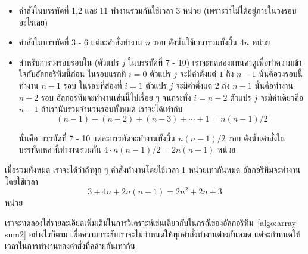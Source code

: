 \begin{itemize}
\item คำสั่ง{\wbr}ใน{\wbr}บรรทัด{\wbr}ที่ 1,2 และ 11 ทำงาน{\wbr}รวม{\wbr}กัน{\wbr}ใช้เวลา 3 หน่วย (เพราะว่า{\wbr}ไม่{\wbr}ได้{\wbr}อยู่{\wbr}ภายใน{\wbr}วงรอบ{\wbr}อะไร{\wbr}เลย)
\item คำสั่ง{\wbr}ใน{\wbr}บรรทัด{\wbr}ที่ 3 - 6 แต่ละ{\wbr}คำสั่ง{\wbr}ทำงาน $n$ รอบ ดังนั้น{\wbr}ใช้เวลา{\wbr}รวม{\wbr}ทั้งสิ้น $4n$ หน่วย{\wbr}
\item สำหรับ{\wbr}การ{\wbr}วงรอบ{\wbr}รอบ{\wbr}ใน (ตัวแปร $j$ ใน{\wbr}บรรทัด{\wbr}ที่ 7 - 10)
เรา{\wbr}จะ{\wbr}ทดลอง{\wbr}แทน{\wbr}ค่า{\wbr}ดู{\wbr}เพื่อ{\wbr}ทำ{\wbr}ความ{\wbr}เข้าใจ{\wbr}กับ{\wbr}อัล{\wbr}กอ{\wbr}ริ{\wbr}ทึม{\wbr}นี้{\wbr}ก่อน ใน{\wbr}รอบ{\wbr}แรก{\wbr}ที่ $i=0$ ตัวแปร $j$
จะ{\wbr}มี{\wbr}ค่า{\wbr}ตั้งแต่ $1$ ถึง $n-1$ นั่น{\wbr}คือ{\wbr}วงรอบ{\wbr}นี้{\wbr}ทำงาน $n-1$ รอบ ใน{\wbr}รอบ{\wbr}ที่{\wbr}สอง{\wbr}ที่ $i=1$
ตัวแปร $j$ จะ{\wbr}มี{\wbr}ค่า{\wbr}ตั้งแต่ $2$ ถึง $n-1$ นั่น{\wbr}คือ{\wbr}ทำงาน $n-2$ รอบ{\wbr}
อัล{\wbr}กอ{\wbr}ริ{\wbr}ทึม{\wbr}จะ{\wbr}ทำงาน{\wbr}เช่นนี้{\wbr}ไป{\wbr}เรื่อย ๆ จนกระทั่ง $i=n-2$ ตัวแปร $j$ จะ{\wbr}มี{\wbr}ค่า{\wbr}เดียว{\wbr}คือ $n-1$
ถ้า{\wbr}เรา{\wbr}นับ{\wbr}รวม{\wbr}จำนวน{\wbr}รอบ{\wbr}ทั้งหมด เรา{\wbr}จะ{\wbr}ได้{\wbr}เท่า{\wbr}กับ{\wbr}
\[
(n-1) + (n-2) + (n-3) +\cdots+1 = n(n-1)/2
\]

นั่น{\wbr}คือ บรรทัด{\wbr}ที่ 7 - 10 แต่ละ{\wbr}บรรทัด{\wbr}จะ{\wbr}ทำงาน{\wbr}ทั้งสิ้น $n(n-1)/2$ รอบ{\wbr}
ดังนั้น{\wbr}คำสั่ง{\wbr}ใน{\wbr}บรรทัด{\wbr}เหล่านี้{\wbr}ทำงาน{\wbr}รวม{\wbr}กัน $4\cdot n(n-1)/2=2n(n-1)$ หน่วย{\wbr}
\end{itemize}

เมื่อ{\wbr}รวม{\wbr}ทั้งหมด เรา{\wbr}จะ{\wbr}ได้{\wbr}ว่า{\wbr}ถ้า{\wbr}ทุก ๆ คำสั่ง{\wbr}ทำงาน{\wbr}โดย{\wbr}ใช้เวลา 1 หน่วย{\wbr}เท่า{\wbr}กัน{\wbr}หมด อัล{\wbr}กอ{\wbr}ริ{\wbr}ทึม{\wbr}จะ{\wbr}ทำงาน{\wbr}โดย{\wbr}ใช้เวลา{\wbr}
\[
3 + 4n + 2n(n-1) = 2n^2 + 2n + 3
\]
หน่วย{\wbr}

เรา{\wbr}จะ{\wbr}ทดลอง{\wbr}ใส่{\wbr}รายละเอียด{\wbr}เพิ่มเติม{\wbr}ใน{\wbr}การ{\wbr}วิเคราะห์{\wbr}เช่นเดียวกับ{\wbr}ใน{\wbr}กรณี{\wbr}ของ{\wbr}อัล{\wbr}กอ{\wbr}ริ{\wbr}ทึม~\ref{algo:array-sum2}
อย่างไรก็ตาม เพื่อ{\wbr}ความ{\wbr}กระชับ{\wbr}เรา{\wbr}จะ{\wbr}ไม่{\wbr}กำหนด{\wbr}ให้{\wbr}ทุก{\wbr}คำสั่ง{\wbr}ทำงาน{\wbr}ต่าง{\wbr}กัน{\wbr}หมด{\wbr}
แต่{\wbr}จะ{\wbr}กำหนด{\wbr}ให้{\wbr}เวลา{\wbr}ใน{\wbr}การ{\wbr}ทำงาน{\wbr}ของ{\wbr}คำสั่ง{\wbr}ที่{\wbr}คล้าย{\wbr}กัน{\wbr}เท่า{\wbr}กัน{\wbr}

